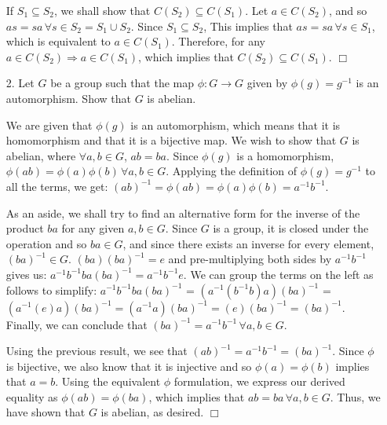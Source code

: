 \documentclass[12pt,letterpaper,reqno]{amsart}
\begin{document}
\begin{enumerate}
\begin{flushleft}
If $S_1 \subseteq S_2$, we shall show that $C(S_2) \subseteq C(S_1)$. Let $a \in C(S_2)$, and so $as = sa\, \forall s \in S_2 = S_1 \cup S_2$. Since $S_1 \subseteq S_2$, This implies that $as = sa\, \forall s \in S_1$, which is equivalent to $a \in C(S_1)$. Therefore, for any $a \in C(S_2) \Rightarrow a \in C(S_1)$, which implies that $C(S_2) \subseteq C(S_1)$. $\Box$
\end{flushleft}

\newpage
\item[2.] Let $G$ be a group such that the map $\phi : G \rightarrow G$ given by $\phi(g) = g^{-1}$ is an automorphism. Show that $G$ is abelian.
\newline

\begin{flushleft}
We are given that $\phi(g)$ is an automorphism, which means that it is homomorphism and that it is a bijective map. We wish to show that $G$ is abelian, where $\forall a, b \in G$, $ab = ba$. Since $\phi(g)$ is a homomorphism, $\phi(ab) = \phi(a)\phi(b)\, \forall a, b \in G$. Applying the definition of $\phi(g) = g^{-1}$ to all the terms, we get: $(ab)^{-1} = \phi(ab) = \phi(a)\phi(b) = a^{-1}b^{-1}$.
\newline

As an aside, we shall try to find an alternative form for the inverse of the product $ba$ for any given $a,b \in G$. Since $G$ is a group, it is closed under the operation and so $ba \in G$, and since there exists an inverse for every element, $(ba)^{-1} \in G$. $(ba)(ba)^{-1} = e$ and pre-multiplying both sides by $a^{-1}b^{-1}$ gives us: $a^{-1}b^{-1}ba(ba)^{-1} = a^{-1}b^{-1}e$. We can group the terms on the left as follows to simplify: $a^{-1}b^{-1}ba(ba)^{-1}$ = $(a^{-1}(b^{-1}b)a)(ba)^{-1}$ = $(a^{-1}(e)a)(ba)^{-1} = (a^{-1}a)(ba)^{-1} = (e)(ba)^{-1} = (ba)^{-1}$. Finally, we can conclude that $(ba)^{-1} = a^{-1}b^{-1}\, \forall a, b \in G$.
\newline

Using the previous result, we see that $(ab)^{-1} = a^{-1}b^{-1} = (ba)^{-1}$. Since $\phi$ is bijective, we also know that it is injective and so $\phi(a) = \phi(b)$ implies that $a = b$. Using the equivalent $\phi$ formulation, we express our derived equality as $\phi(ab) = \phi(ba)$, which implies that $ab = ba\, \forall a, b \in G$. Thus, we have shown that $G$ is abelian, as desired. $\Box$
\newline
\end{flushleft}
\newpage


\end{enumerate}
\end{document}
